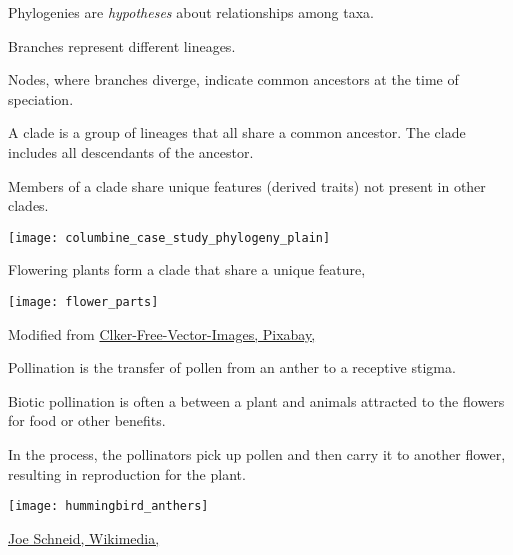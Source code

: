 \documentclass[t,hidelinks]{beamer}
\begin{document}
%
\begin{frame}[t]{Phylogenies are \emph{hypotheses} about relationships among taxa.}
	
	\begin{multicols}{2}
		\hangpara Branches represent different lineages.\vspace*{-1ex}

		\hangpara Nodes, where branches diverge, indicate common ancestors at the time of speciation.\vspace*{-1ex}

		\hangpara A clade is a group of lineages that all share a common ancestor. The clade includes all descendants of the ancestor.\vspace*{-1ex}
			
		\hangpara Members of a clade share unique features (derived traits) not present in other clades.\vspace*{-1ex} %

	\columnbreak
		
		\hfill \texttt{[image: columbine\_case\_study\_phylogeny\_plain]}
		
	\end{multicols}
\end{frame}
%
\begin{frame}[t]{Flowering plants form a clade that share a unique feature, }
	
	{\centering 
	\texttt{[image: flower\_parts]}
	}
	
	\vfilll
	
	\hfill \tiny Modified from \href{https://pixabay.com/en/diagram-flower-mature-anatomy-41571/}{Clker-Free-Vector-Images, Pixabay, \cc{}}
	
\end{frame}
%
\begin{frame}[t]{Pollination is the transfer of pollen from an anther to a receptive stigma.}

	\begin{multicols}{2}
	\hangpara Biotic pollination is often a  between a plant and animals attracted to the flowers for food or other benefits. 
	
	\hangpara In the process, the pollinators pick up pollen and then carry it to another flower, resulting in reproduction for the plant. 

	\columnbreak
	
	\texttt{[image: hummingbird\_anthers]}
	\end{multicols}
	
	\vfilll
	
	\hfill \tiny \href{https://commons.wikimedia.org/wiki/File:RubyThroatedHummingbird.jpg}{Joe Schneid, Wikimedia, } %
	
\end{frame}
\end{document}
